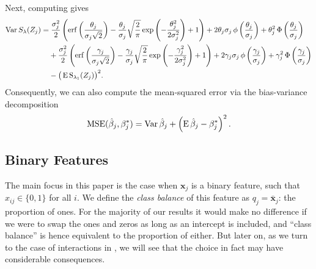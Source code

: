 Next, computing  gives
\begin{align}
  \label{eq:mean-centered-variance}
  \var{S_\lambda(Z_j)} & = \frac{\sigma_j^2}{2} \left( \erf\left(\frac{\theta_j}{\sigma_j\sqrt{2}}\right) - \frac{\theta_j}{\sigma_j}\sqrt{\frac{2}{\pi}} \exp\left(-\frac{\theta_j^2}{2\sigma_j^2}\right) + 1 \right) + 2 \theta_j \sigma_j \pdf \left(\frac{\theta_j}{\sigma_j}\right) + \theta_j^2 \cdf\left(\frac{\theta_j}{\sigma_j}\right) \nonumber               \\
                       & \phantom{={}} + \frac{\sigma_j^2}{2} \left( \erf\left(\frac{\gamma_j}{\sigma_j\sqrt{2}}\right) - \frac{\gamma_j}{\sigma_j}\sqrt{\frac{2}{\pi}} \exp\left(-\frac{\gamma_j^2}{2\sigma_j^2}\right) + 1 \right) + 2 \gamma_j \sigma_j \pdf \left(\frac{\gamma_j}{\sigma_j}\right) + \gamma_j^2 \cdf\left(\frac{\gamma_j}{\sigma_j}\right) \nonumber \\
                       & \phantom{={}} - \big(\E \st_{\lambda_1}({Z_j})\big)^2.
\end{align}
Consequently, we can also
compute the mean-squared error via the bias-variance decomposition
\begin{equation*}
  \operatorname{MSE} (\hat\beta_j, \beta^*_j) = \operatorname{Var}\hat\beta_j + \left(\operatorname{E} \hat\beta_j - \beta^*_j\right)^2.
\end{equation*}

\subsection{Binary Features}\label{sec:theory-binary-features}

The main focus in this paper is the case when \(\bm{x}_j\) is a binary feature, such that
\(x_{ij} \in \{0, 1\}\) for all \(i\). We define the \emph{class balance} of this feature
as \(q_j = \bar{\bm{x}}_j\): the proportion of ones. For the majority of our results it
would make no difference if we were to swap the ones and zeros as long as an intercept is
included, and ``class balance'' is hence equivalent to the proportion of either. But later
on, as we turn to the case of interactions in , we will see that the
choice in fact may have considerable consequences.

